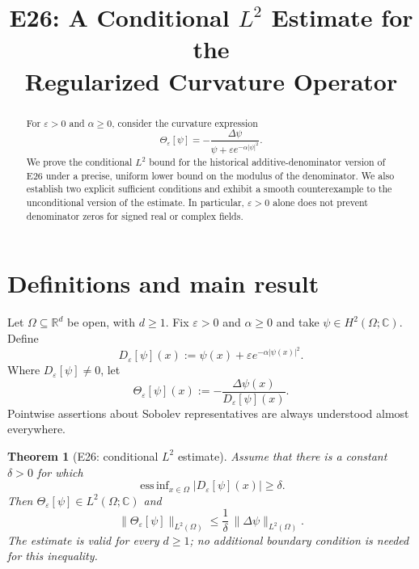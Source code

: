 \documentclass[11pt]{article}
\title{E26: A Conditional $L^2$ Estimate for the\\
Regularized Curvature Operator}
\author{}
\date{}
\newtheorem{theorem}{Theorem}
\theoremstyle{remark}
\DeclareMathOperator*{\essinf}{ess\,inf}
\begin{document}
\maketitle

\begin{abstract}
For $\varepsilon>0$ and $\alpha\geq0$, consider the curvature
expression
\[
\Theta_\varepsilon[\psi]
=-\frac{\Delta\psi}
{\psi+\varepsilon e^{-\alpha|\psi|^2}}.
\]
We prove the conditional $L^2$ bound for the historical
additive-denominator version of E26 under a precise,
uniform lower bound on the modulus of the denominator. We also establish
two explicit sufficient conditions and exhibit a smooth counterexample
to the unconditional version of the estimate. In particular,
$\varepsilon>0$ alone does not prevent denominator zeros for signed
real or complex fields.
\end{abstract}

\section{Definitions and main result}
Let $\Omega\subseteq\mathbb R^d$ be open, with $d\geq1$.
Fix $\varepsilon>0$ and $\alpha\geq0$ and take
$\psi\in H^2(\Omega;\mathbb C)$. Define
\begin{equation}\label{eq:D}
D_\varepsilon[\psi](x)
:=\psi(x)+\varepsilon e^{-\alpha|\psi(x)|^2}.
\end{equation}
Where $D_\varepsilon[\psi]\neq0$, let
\begin{equation}\label{eq:Theta}
\Theta_\varepsilon[\psi](x)
:=-\frac{\Delta\psi(x)}{D_\varepsilon[\psi](x)}.
\end{equation}
Pointwise assertions about Sobolev representatives are always
understood almost everywhere.

\begin{theorem}[E26: conditional $L^2$ estimate]\label{thm:E26}
Assume that there is a constant $\delta>0$ for which
\begin{equation}\label{eq:H}
\essinf_{x\in\Omega}\bigl|D_\varepsilon[\psi](x)\bigr|
\geq\delta.
\end{equation}
Then $\Theta_\varepsilon[\psi]\in L^2(\Omega;\mathbb C)$ and
\begin{equation}\label{eq:E26}
\boxed{
\bigl\|\Theta_\varepsilon[\psi]\bigr\|_{L^2(\Omega)}
\leq\frac{1}{\delta}\,
\bigl\|\Delta\psi\bigr\|_{L^2(\Omega)}.
}
\end{equation}
The estimate is valid for every $d\geq1$; no additional boundary
condition is needed for this inequality.
\end{theorem}
\end{document}
